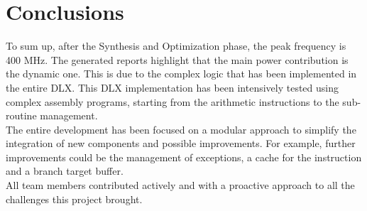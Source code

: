 \chapter{Conclusions}
To sum up, after the Synthesis and Optimization phase, the peak frequency is 400 MHz. The generated reports highlight that the main power contribution is the dynamic one. This is due to the complex logic that has been implemented in the entire DLX. This DLX implementation has been intensively tested using complex assembly programs, starting from the arithmetic instructions to the sub-routine management.\\

The entire development has been focused on a modular approach to simplify the integration of new components and possible improvements. For example, further improvements could be the management of exceptions, a cache for the instruction and a branch target buffer.\\

All team members contributed actively and with a proactive approach to all the challenges this project brought. \\
